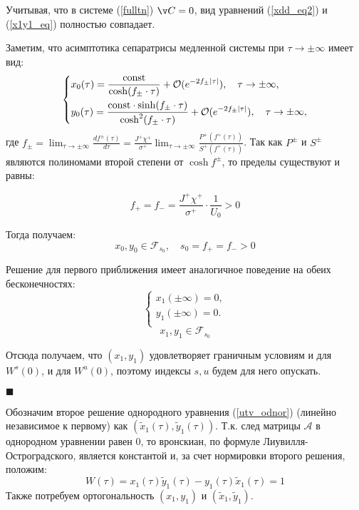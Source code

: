 \begin{enumerate}
Учитывая, что в системе (\ref{fulltn}) $\v C = 0$, вид уравнений (\ref{xdd_eq2}) и (\ref{x1y1_eq}) полностью совпадает.

Заметим, что асимптотика сепаратрисы медленной системы при $\tau \to \pm \infty$ имеет вид: 
\begin{equation*}
    \begin{dcases}
        x_0(\tau) = \frac{\text{const}}{\cosh(f_\pm \cdot \tau)} + \mathcal{O}(e^{-2 f_\pm |\tau|}), \quad \tau \to \pm \infty,\\
        y_0(\tau) = \frac{\text{const} \cdot \sinh(f_\pm \cdot \tau)}{\cosh^2(f_\pm \cdot \tau)} + \mathcal{O}(e^{-2 f_\pm |\tau|}), \quad \tau \to \pm \infty,
    \end{dcases}
\end{equation*}
где $f_\pm = \lim_{\tau \to \pm \infty} \frac{d f^\pm(\tau)}{d\tau} = \frac{J^{+} \chi^{+}}{\sigma^{+}}  \lim_{\tau \to \pm \infty} \frac{P^{+}(f^{+}(\tau))}{S^{+}(f^{+}(\tau))}$. Так как $P^\pm$ и $S^\pm$ являются полиномами второй степени от $\cosh f^\pm$, то пределы существуют и  равны:
 
$$f_+ = f_- = \frac{J^{+} \chi^{+}}{\sigma^{+}} \cdot \frac{1}{U_0} >0$$

Тогда получаем:
$$x_0,y_0 \in \mathcal{F}_{s_0}, \quad s_0 = f_+ = f_- > 0$$

Решение для первого приближения имеет аналогичное поведение на обеих бесконечностях:
\begin{equation*}
    \begin{cases}
        x_1(\pm \infty) = 0, \\
        
        y_1(\pm \infty) = 0. \\
    \end{cases}
\end{equation*}
$$x_1, y_1 \in \mathcal{F}_{s_0}$$

Отсюда получаем, что $(x_1,y_1)$ удовлетворяет граничным условиям и для $W^s(0)$, и для $W^u(0)$, поэтому индексы $s,u$ будем для него опускать. 

$\blacksquare$

\end{enumerate}

Обозначим второе решение однородного уравнения (\ref{utv_odnor}) (линейно независимое к первому) как $(\tilde x_1 (\tau), \tilde y_1 (\tau))$. Т.к. след матрицы $\mathcal{A}$ в однородном уравнении равен 0, то вронскиан, по формуле Лиувилля-Остроградского, является константой и, за счет нормировки второго решения, положим:
$$W(\tau) = x_1(\tau) \tilde y_1 (\tau) - y_1 (\tau) \tilde x_1 (\tau) = 1$$
Также потребуем ортогональность $(x_1, y_1)$ и $(\tilde x_1, \tilde y_1)$.

